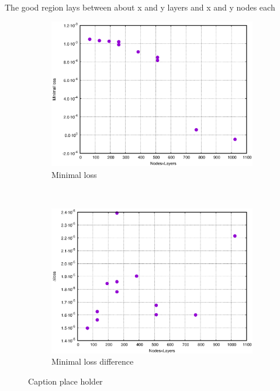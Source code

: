 The good region lays between about x and y layers and x and y nodes each

\begin{figure}[htbp]
    \centering
    \begin{subfigure}[b]{0.5\textwidth}
        \centering
        \includegraphics[width=\textwidth]{figures_simpleNN/minimal_loss.eps}
        \caption{Minimal loss}
        \label{fig:minimal_loss}
    \end{subfigure}%
    ~ 
    \begin{subfigure}[b]{0.5\textwidth}
        \centering
        \includegraphics[width=\textwidth]{figures_simpleNN/minimal_diff.eps}
        \caption{Minimal loss difference}
        \label{fig:minimal_diff}
    \end{subfigure}
    \caption{Caption place holder}
    \label{fig:net_complexity}
\end{figure}



